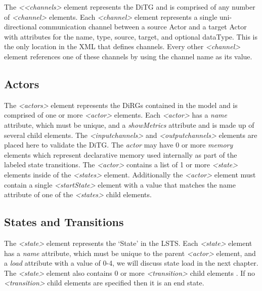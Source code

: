 The {\em \textless <channels\textgreater} element represents the DiTG and is comprised of any number of {\em \textless channel\textgreater} elements.  Each {\em \textless channel\textgreater} element represents a single uni-directional communication channel between a source Actor and a target Actor with attributes for the name, type, source, target, and optional dataType.  This is the only location in the XML that defines channels.  Every other {\em \textless channel\textgreater} element references one of these channels by using the channel name as its value.

\begin{spacing}{.5}

\end{spacing}

\subsection{Actors}

The {\em \textless actors\textgreater} element represents the DiRGs contained in the model and is comprised of one or more {\em \textless actor\textgreater} elements.  Each {\em \textless actor\textgreater} has a {\em name} attribute, which must be unique, and a {\em showMetrics} attribute and is made up of several child elements.  The {\em \textless inputchannels\textgreater} and {\em \textless outputchannels\textgreater} elements are placed here to validate the DiTG.  The {\em actor} may have 0 or more {\em memory} elements which represent declarative memory used internally as part of the labeled state transitions.  The {\em \textless actor\textgreater} contains a list of 1 or more {\em \textless state\textgreater} elements inside of the {\em \textless states\textgreater} element.  Additionally the {\em \textless actor\textgreater} element must contain a single {\em \textless startState\textgreater} element with a value that matches the name attribute of one of the {\em \textless states\textgreater} child elements.

\begin{spacing}{.5}

\end{spacing}


\subsection{States and Transitions}

The {\em \textless state\textgreater} element represents the `State' in the LSTS.  Each {\em \textless state\textgreater} element has a {\em name} attribute, which must be unique to the parent {\em \textless actor\textgreater} element, and a {\em load} attribute with a value of 0-4, we will discuss state load in the next chapter.  The {\em \textless state\textgreater} element also contains 0 or more {\em \textless transition\textgreater} child elements .  If no {\em \textless transition\textgreater} child elements are specified then it is an end state.  

